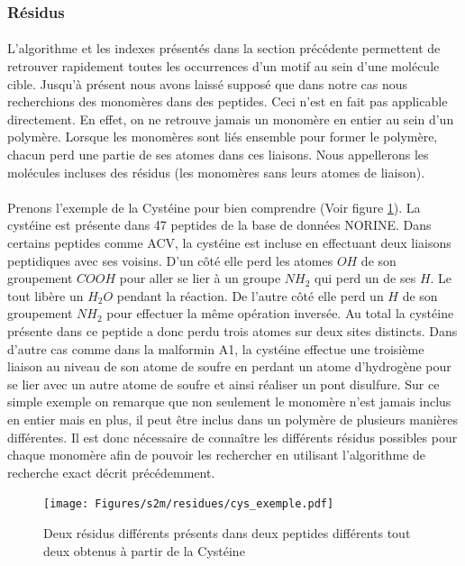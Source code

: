 \documentclass[12pt,french,twoside]{report}
\begin{document}
\subsubsection{Résidus}

\paragraph{}L'algorithme et les indexes présentés dans la section précédente permettent de retrouver rapidement toutes les
occurrences d'un motif au sein d'une molécule cible. Jusqu'à présent nous avons laissé supposé que dans notre cas
nous recherchions des monomères dans des peptides. Ceci n'est en fait pas applicable directement. En effet, on ne retrouve jamais
un monomère en entier au sein d'un polymère. Lorsque les monomères sont liés ensemble pour former le polymère, chacun perd une
partie de ses atomes dans ces liaisons. Nous appellerons les molécules incluses des résidus (les monomères sans leurs atomes de
liaison).

\paragraph{}Prenons l'exemple de la Cystéine pour bien comprendre (Voir figure \ref{cys_ex}).
La cystéine est présente dans 47 peptides de la base de données
NORINE. Dans certains peptides comme ACV, la cystéine est incluse en effectuant deux liaisons peptidiques avec ses voisins. D'un
côté elle perd les atomes $OH$ de son groupement $COOH$ pour aller se lier à un groupe $NH_2$ qui perd un de ses $H$. Le tout
libère un $H_2O$ pendant la réaction. De l'autre côté elle perd un $H$ de son groupement $NH_2$ pour effectuer la même opération
inversée. Au total la cystéine présente dans ce peptide a donc perdu trois atomes sur deux sites distincts. Dans d'autre cas
comme dans la malformin A1, la cystéine effectue une troisième liaison au niveau de son atome de soufre en perdant un atome 
d'hydrogène pour se lier avec un autre atome de soufre et ainsi réaliser un pont disulfure. Sur ce simple exemple on remarque que
non seulement le monomère n'est jamais inclus en entier mais en plus, il peut être inclus dans un polymère de plusieurs manières
différentes. Il est donc nécessaire de connaître les différents résidus possibles pour chaque monomère afin de pouvoir les
rechercher en utilisant l'algorithme de recherche exact décrit précédemment.

\begin{figure}
  \texttt{[image: Figures/s2m/residues/cys\_exemple.pdf]}
  \caption{\label{cys_ex}Deux résidus différents présents dans deux peptides différents tout deux obtenus à partir de la Cystéine}
\end{figure}
\end{document}
